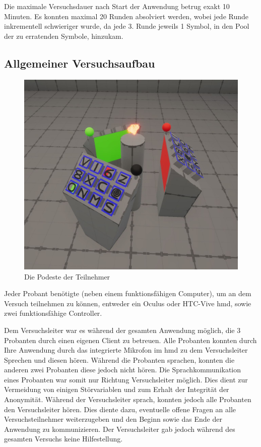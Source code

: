 \documentclass[a4paper,11pt]{article}%
\renewcommand{\\}{\vspace*{0.5\baselineskip} \newline}
\begin{document}
Die maximale Versuchsdauer nach Start der Anwendung betrug exakt 10 Minuten. Es konnten maximal 20 Runden absolviert werden, wobei jede Runde inkrementell schwieriger wurde, da jede 3. Runde jeweils 1 Symbol, in den Pool der zu erratenden Symbole, hinzukam. 


	\subsection{Allgemeiner Versuchsaufbau}

\begin{figure}[H]
		\begin{footnotesize}
			\includegraphics[width=\textwidth]{Abbildungen/Podeste.JPG}\\
			\caption[Abbildung 1]{Die Podeste der Teilnehmer}
			\label{Framework}
		\end{footnotesize}
	\end{figure}

Jeder Probant benötigte (neben einem funktionsfähigen Computer), um an dem Versuch teilnehmen zu können, entweder ein Oculus oder HTC-Vive \ac{hmd}, sowie zwei funktionsfähige Controller.

Dem Versuchsleiter war es während der gesamten Anwendung möglich, die 3 Probanten durch einen eigenen Client zu betreuen. Alle Probanten konnten durch Ihre Anwendung durch das integrierte Mikrofon im \ac{hmd} zu dem Versuchsleiter Sprechen und diesen hören. Während die Probanten sprachen, konnten die anderen zwei Probanten diese jedoch nicht hören. Die Sprachkommunikation eines Probanten war somit nur Richtung Versuchsleiter möglich. Dies dient zur Vermeidung von einigen Störvariablen und zum Erhalt der Integrität der Anonymität.
Während der Versuchsleiter sprach, konnten jedoch alle Probanten den Versuchsleiter hören. Dies diente dazu, eventuelle offene Fragen an alle Versuchsteilnehmer weiterzugeben und den Beginn sowie das Ende der Anwendung zu kommunizieren. Der Versuchsleiter gab jedoch während des gesamten Versuchs keine Hilfestellung.
\end{document}
